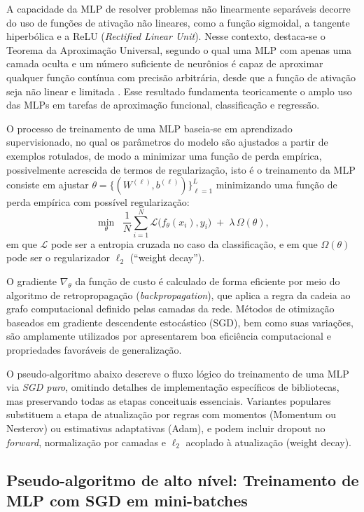 A capacidade da MLP de resolver problemas não linearmente separáveis decorre do
uso de funções de ativação não lineares, como a função sigmoidal, a tangente
hiperbólica e a ReLU (\emph{Rectified Linear Unit}). Nesse contexto, destaca-se o
Teorema da Aproximação Universal, segundo o qual uma MLP com apenas uma camada
oculta e um número suficiente de neurônios é capaz de aproximar qualquer função
contínua com precisão arbitrária, desde que a função de ativação seja não linear
e limitada . Esse
resultado fundamenta teoricamente o amplo uso das MLPs em tarefas de aproximação
funcional, classificação e regressão.

O processo de treinamento de uma MLP baseia-se em aprendizado supervisionado, no
qual os parâmetros do modelo são ajustados a partir de exemplos rotulados, de
modo a minimizar uma função de perda empírica, possivelmente acrescida de termos
de regularização, isto é o treinamento da MLP consiste em ajustar \(\theta=\{(W^{(\ell)},b^{(\ell)})\}_{\ell=1}^{L}\) minimizando uma função de perda empírica com possível regularização:
\[
\min_{\theta}\;\; \frac{1}{N}\sum_{i=1}^{N}\mathcal{L}\big(f_{\theta}(x_i),y_i\big)\;+\;\lambda\,\Omega(\theta),
\]
em que \(\mathcal{L}\) pode ser a entropia cruzada no caso da classificação, e em que \(\Omega(\theta)\) pode ser o regularizador \(\ell_2\) (``weight decay''). 

O gradiente \(\nabla_{\theta}\) da função  de custo é calculado de forma eficiente
por meio do algoritmo de retropropagação (\emph{backpropagation}), que aplica a
regra da cadeia ao grafo computacional definido pelas camadas da rede. Métodos de
otimização baseados em gradiente descendente estocástico (SGD), bem como suas
variações, são amplamente utilizados por apresentarem boa eficiência
computacional e propriedades favoráveis de generalização.

O pseudo-algoritmo abaixo descreve o fluxo lógico do treinamento de uma MLP via \emph{SGD puro}, omitindo detalhes de implementação específicos de bibliotecas, mas preservando todas as etapas conceituais essenciais. 
Variantes populares substituem a etapa de atualização por regras com momentos (Momentum ou Nesterov) ou estimativas adaptativas (Adam), e podem incluir dropout no \emph{forward}, normalização por camadas e \(\ell_2\) acoplado à atualização (weight decay).


\subsection*{Pseudo-algoritmo de alto nível: Treinamento de MLP com SGD em mini-batches}

